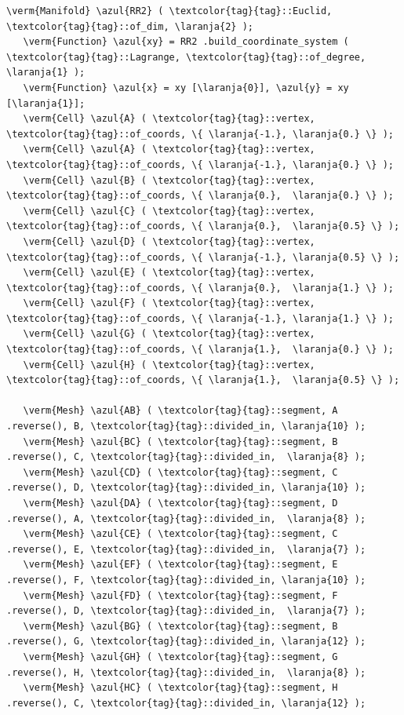 \begin{Verbatim}[commandchars=\\\{\},formatcom=\small\tt,frame=single,
   label=parag-\ref{\numb section 1.\numb parag 4}.cpp,rulecolor=\color{moldura},
   baselinestretch=0.94,framesep=2mm]
   \verm{Manifold} \azul{RR2} ( \textcolor{tag}{tag}::Euclid, \textcolor{tag}{tag}::of_dim, \laranja{2} );
   \verm{Function} \azul{xy} = RR2 .build_coordinate_system ( \textcolor{tag}{tag}::Lagrange, \textcolor{tag}{tag}::of_degree, \laranja{1} );
   \verm{Function} \azul{x} = xy [\laranja{0}], \azul{y} = xy [\laranja{1}];
   \verm{Cell} \azul{A} ( \textcolor{tag}{tag}::vertex, \textcolor{tag}{tag}::of_coords, \{ \laranja{-1.}, \laranja{0.} \} );
   \verm{Cell} \azul{A} ( \textcolor{tag}{tag}::vertex, \textcolor{tag}{tag}::of_coords, \{ \laranja{-1.}, \laranja{0.} \} );
   \verm{Cell} \azul{B} ( \textcolor{tag}{tag}::vertex, \textcolor{tag}{tag}::of_coords, \{ \laranja{0.},  \laranja{0.} \} );
   \verm{Cell} \azul{C} ( \textcolor{tag}{tag}::vertex, \textcolor{tag}{tag}::of_coords, \{ \laranja{0.},  \laranja{0.5} \} );
   \verm{Cell} \azul{D} ( \textcolor{tag}{tag}::vertex, \textcolor{tag}{tag}::of_coords, \{ \laranja{-1.}, \laranja{0.5} \} );
   \verm{Cell} \azul{E} ( \textcolor{tag}{tag}::vertex, \textcolor{tag}{tag}::of_coords, \{ \laranja{0.},  \laranja{1.} \} );
   \verm{Cell} \azul{F} ( \textcolor{tag}{tag}::vertex, \textcolor{tag}{tag}::of_coords, \{ \laranja{-1.}, \laranja{1.} \} );
   \verm{Cell} \azul{G} ( \textcolor{tag}{tag}::vertex, \textcolor{tag}{tag}::of_coords, \{ \laranja{1.},  \laranja{0.} \} );
   \verm{Cell} \azul{H} ( \textcolor{tag}{tag}::vertex, \textcolor{tag}{tag}::of_coords, \{ \laranja{1.},  \laranja{0.5} \} );

   \verm{Mesh} \azul{AB} ( \textcolor{tag}{tag}::segment, A .reverse(), B, \textcolor{tag}{tag}::divided_in, \laranja{10} );
   \verm{Mesh} \azul{BC} ( \textcolor{tag}{tag}::segment, B .reverse(), C, \textcolor{tag}{tag}::divided_in,  \laranja{8} );
   \verm{Mesh} \azul{CD} ( \textcolor{tag}{tag}::segment, C .reverse(), D, \textcolor{tag}{tag}::divided_in, \laranja{10} );
   \verm{Mesh} \azul{DA} ( \textcolor{tag}{tag}::segment, D .reverse(), A, \textcolor{tag}{tag}::divided_in,  \laranja{8} );
   \verm{Mesh} \azul{CE} ( \textcolor{tag}{tag}::segment, C .reverse(), E, \textcolor{tag}{tag}::divided_in,  \laranja{7} );
   \verm{Mesh} \azul{EF} ( \textcolor{tag}{tag}::segment, E .reverse(), F, \textcolor{tag}{tag}::divided_in, \laranja{10} );
   \verm{Mesh} \azul{FD} ( \textcolor{tag}{tag}::segment, F .reverse(), D, \textcolor{tag}{tag}::divided_in,  \laranja{7} );
   \verm{Mesh} \azul{BG} ( \textcolor{tag}{tag}::segment, B .reverse(), G, \textcolor{tag}{tag}::divided_in, \laranja{12} );
   \verm{Mesh} \azul{GH} ( \textcolor{tag}{tag}::segment, G .reverse(), H, \textcolor{tag}{tag}::divided_in,  \laranja{8} );
   \verm{Mesh} \azul{HC} ( \textcolor{tag}{tag}::segment, H .reverse(), C, \textcolor{tag}{tag}::divided_in, \laranja{12} );


\end{Verbatim}
